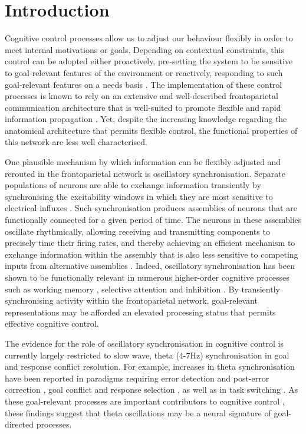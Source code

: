 \documentclass[preprint,authoryear,11pt,5p,times,twocolumns]{elsarticle}
\begin{document}
\section{Introduction}

Cognitive control processes allow us to adjust our behaviour flexibly in order to meet internal motivations or goals. Depending on contextual constraints, this control can be adopted either proactively, pre-setting the system to be sensitive to goal-relevant features of the environment or reactively, responding to such goal-relevant features on a needs basis \citep{Braver}.  The implementation of these control processes is known to rely on an extensive and well-described frontoparietal communication architecture \citep{Corbetta,Seeley,Vincent} that is well-suited to promote flexible and rapid information propagation \citep{Dosenbach}. Yet, despite the increasing knowledge regarding the anatomical architecture that permits flexible control, the functional properties of this network are less well characterised. 


One plausible mechanism by which information can be flexibly adjusted and rerouted in the frontoparietal network is oscillatory synchronisation. Separate populations of neurons are able to exchange information transiently by synchronising the excitability windows in which they are most sensitive to electrical influxes \citep{Fries,Womelsdorf}.  Such synchronisation produces assemblies of neurons that are functionally connected for a given period of time. The neurons in these assemblies oscillate rhythmically, allowing receiving and transmitting components to precisely time their firing rates, and thereby achieving an efficient mechanism to exchange information within the assembly that is also less sensitive to competing inputs from alternative assemblies \citep{Azouz,Engel}.  Indeed, oscillatory synchronisation has been shown to be functionally relevant in numerous higher-order cognitive processes such as working memory \citep{Huang,Palva2005,Pesonen,Sauseng2005,Wu}, 
\nopagebreak selective attention \citep{Doesburg2,Doesburg,Kahlbrock,Maris} and inhibition \citep{Papenberg,Serrien,Tallet}. By transiently synchronising activity within the frontoparietal network, goal-relevant representations may be afforded an elevated processing status that permits effective cognitive control.  


The evidence for the role of oscillatory synchronisation in cognitive control is currently largely restricted to slow wave, theta (4-7Hz) synchronisation in goal and response conflict resolution. For example, increases in theta synchronisation have been reported in paradigms requiring error detection and post-error correction \citep{Cavanagh,Luu,Trujillo}, goal conflict and response selection \citep{Moore2006, Moore2012}, as well as in task switching \citep{SausengTSWT}. As these goal-relevant processes are important contributors to cognitive control \citep{Miyake}, these findings suggest that theta oscillations may be a neural signature of goal-directed processes. 
\end{document}
